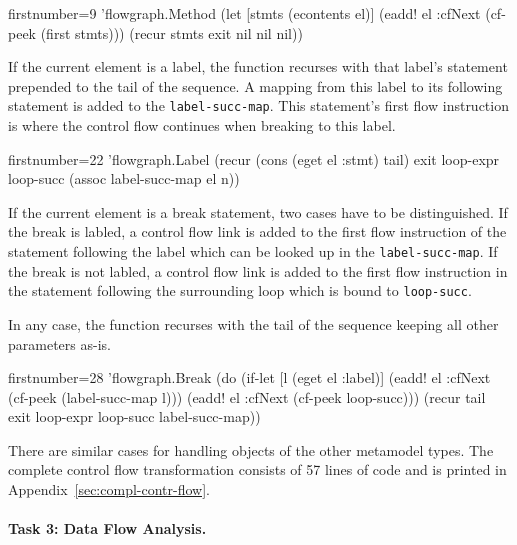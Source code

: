 \documentclass[submission]{eptcs}
\begin{document}
\begin{clojurecode*}{firstnumber=9}
        'flowgraph.Method (let [stmts (econtents el)]
                            (eadd! el :cfNext (cf-peek (first stmts)))
                            (recur stmts exit nil nil nil))
\end{clojurecode*}

If the current element is a label, the function recurses with that label's
statement prepended to the tail of the sequence.  A mapping from this label to
its following statement is added to the \verb|label-succ-map|.  This
statement's first flow instruction is where the control flow continues when
breaking to this label.

\begin{clojurecode*}{firstnumber=22}
        'flowgraph.Label (recur (cons (eget el :stmt) tail) exit loop-expr loop-succ
                                (assoc label-succ-map el n))
\end{clojurecode*}

If the current element is a break statement, two cases have to be
distinguished.  If the break is labled, a control flow link is added to the
first flow instruction of the statement following the label which can be looked
up in the \verb|label-succ-map|.  If the break is not labled, a control flow
link is added to the first flow instruction in the statement following the
surrounding loop which is bound to \verb|loop-succ|.

In any case, the function recurses with the tail of the sequence keeping all
other parameters as-is.

\begin{clojurecode*}{firstnumber=28}
        'flowgraph.Break (do (if-let [l (eget el :label)]
                               (eadd! el :cfNext (cf-peek (label-succ-map l)))
                               (eadd! el :cfNext (cf-peek loop-succ)))
                           (recur tail exit loop-expr loop-succ label-succ-map))
\end{clojurecode*}

There are similar cases for handling objects of the other metamodel types.  The
complete control flow transformation consists of 57 lines of code and is
printed in Appendix~\ref{sec:compl-contr-flow}.


\paragraph{Task 3: Data Flow Analysis.}
\label{sec:task-3}
\end{document}
